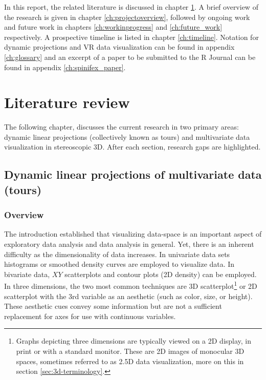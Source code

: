 \documentclass{monashthesis}
\begin{document}
In this report, the related literature is discussed in chapter
\ref{ch:lit_review}. A brief overview of the research is given in
chapter \ref{ch:projectoverview}, followed by ongoing work and future
work in chapters \ref{ch:workinprogress} and \ref{ch:future_work}
respectively. A prospective timeline is listed in chapter
\ref{ch:timeline}. Notation for dynamic projections and VR data
visualization can be found in appendix \ref{ch:glossary} and an excerpt
of a paper to be submitted to the R Journal can be found in appendix
\ref{ch:spinifex_paper}.

\chapter{Literature review}\label{ch:lit_review}

The following chapter, discusses the current research in two primary
areas: dynamic linear projections (collectively known as tours) and
multivariate data visualization in stereoscopic 3D. After each section,
research gaps are highlighted.

\section{Dynamic linear projections of multivariate data
(tours)}\label{sec:tour}

\subsection{Overview}\label{overview}

The introduction established that visualizing data-space is an important
aspect of exploratory data analysis and data analysis in general. Yet,
there is an inherent difficulty as the dimensionality of data increases.
In univariate data sets histograms or smoothed density curves are
employed to visualize data. In bivariate data, \(XY\) scatterplots and
contour plots (2D density) can be employed. In three dimensions, the two
most common techniques are 3D
scatterplot\footnote{Graphs depicting three dimensions are typically viewed on a 2D display, in print or with a standard monitor. These are 2D images of monocular 3D spaces, sometimes referred to as 2.5D data visualization, more on this in section \ref{sec:3d-terminology}.}
or 2D scatterplot with the 3rd variable as an aesthetic (such as color,
size, or height). These aesthetic cues convey some information but are
not a sufficient replacement for axes for use with continuous variables.
\end{document}
